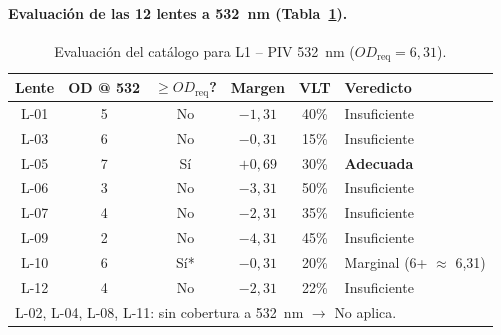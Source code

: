 \documentclass[12pt,a4paper]{article}
\begin{document}
\paragraph{Evaluación de las 12 lentes a 532~nm (Tabla~\ref{tab:eval_L1}).}

\begin{table}[H]
	\centering
	\caption{Evaluación del catálogo para L1 -- PIV 532~nm ($OD_{\mathrm{req}} = 6{,}31$).}
	\label{tab:eval_L1}
	\small
	\begin{tabular}{c c c c c l}
		\toprule
		\textbf{Lente} & \textbf{OD @ 532} & \textbf{$\ge OD_{\mathrm{req}}$?}
		               & \textbf{Margen}   & \textbf{VLT}                      & \textbf{Veredicto}                                                               \\
		\midrule
		L-01           & 5                 & No                                & $-1{,}31$          & 40\% & \textcolor{aerored}{Insuficiente}                    \\
		L-03           & 6                 & No                                & $-0{,}31$          & 15\% & \textcolor{aerored}{Insuficiente}                    \\
		\rowcolor{aerogreen!15}
		L-05           & 7                 & Sí                                & $+0{,}69$          & 30\% & \textcolor{aerogreen}{\textbf{Adecuada}}             \\
		L-06           & 3                 & No                                & $-3{,}31$          & 50\% & \textcolor{aerored}{Insuficiente}                    \\
		L-07           & 4                 & No                                & $-2{,}31$          & 35\% & \textcolor{aerored}{Insuficiente}                    \\
		L-09           & 2                 & No                                & $-4{,}31$          & 45\% & \textcolor{aerored}{Insuficiente}                    \\
		\rowcolor{aerogreen!15}
		L-10           & 6                 & Sí*                               & $-0{,}31$          & 20\% & \textcolor{aeroyellow}{Marginal (6+ $\approx$ 6,31)} \\
		L-12           & 4                 & No                                & $-2{,}31$          & 22\% & \textcolor{aerored}{Insuficiente}                    \\
		\midrule
		\multicolumn{6}{l}{\footnotesize L-02, L-04, L-08, L-11: sin cobertura a 532~nm $\rightarrow$ \textcolor{aerored}{No aplica}.}                            \\
		\bottomrule
	\end{tabular}
\end{table}
\end{document}
